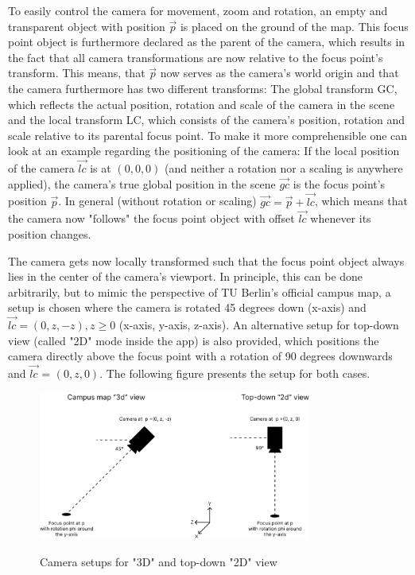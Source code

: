 To easily control the camera for movement, zoom and rotation, an empty and transparent object with position $\overrightarrow{p}$ is placed on the ground of the map. This focus point object is furthermore declared as the parent of the camera, which results in the fact that all camera transformations are now relative to the focus point's transform. This means, that $\overrightarrow{p}$ now serves as the camera's world origin and that the camera furthermore has two different transforms: The global transform GC, which reflects the actual position, rotation and scale of the camera in the scene and the local transform LC, which consists of the camera's position, rotation and scale relative to its parental focus point. To make it more comprehensible one can look at an example regarding the positioning of the camera: If the local position of the camera $\overrightarrow{lc}$ is at $(0, 0, 0)$ (and neither a rotation nor a scaling is anywhere applied), the camera's true global position in the scene $\overrightarrow{gc}$ is the focus point's position $\overrightarrow{p}$. In general (without rotation or scaling) $\overrightarrow{gc} = \overrightarrow{p} + \overrightarrow{lc}$, which means that the camera now "follows" the focus point object with offset $\overrightarrow{lc}$ whenever its position changes.

The camera gets now locally transformed such that the focus point object always lies in the center of the camera's viewport. In principle, this can be done arbitrarily, but to mimic the perspective of TU Berlin's official campus map, a setup is chosen where the camera is rotated 45 degrees down (x-axis) and $\overrightarrow{lc} = (0, z, -z), z \geq 0$ (x-axis, y-axis, z-axis). An alternative setup for top-down view (called "2D" mode inside the app) is also provided, which positions the camera directly above the focus point with a rotation of 90 degrees downwards and $\overrightarrow{lc}$ = $(0, z, 0)$. The following figure presents the setup for both cases.

\begin{figure}[H]
	\centering
	\includegraphics[width=0.8\textwidth]{images/camera_setup.png}\\
	\caption{Camera setups for "3D" and top-down "2D" view}
\end{figure}

